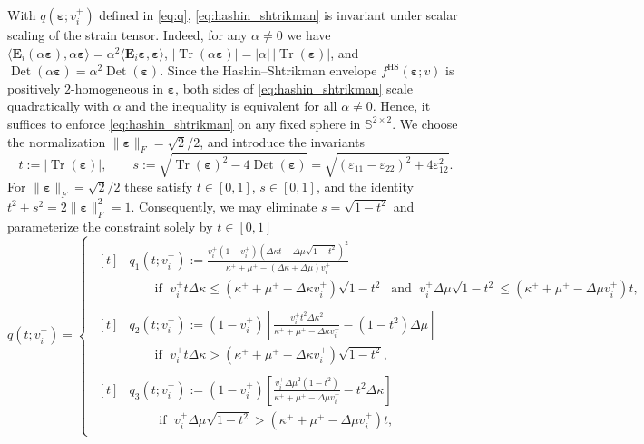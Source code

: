 \documentclass[preprint,3p]{elsarticle}
\newcommand{\tenss}[1]{\bm{\mathbf{#1}}}            %
\newcommand{\tensf}[1]{\bm{\mathbf{#1}}}            %
\newcommand{\strain}{\tenss{\varepsilon}}           %
\newcommand{\Ei}{\tensf{E}_i}                       %
\newcommand{\Tr}{\operatorname{Tr}}
\newcommand{\Det}{\operatorname{Det}}
\begin{document}
With $q(\strain;v_i^+)$ defined in \eqref{eq:q}, \eqref{eq:hashin_shtrikman} is invariant under scalar scaling of the strain tensor. Indeed, for any $\alpha\neq 0$ we have $\langle \Ei(\alpha\strain),\alpha\strain\rangle=\alpha^2\langle \Ei\strain,\strain\rangle$, $\lvert\Tr(\alpha\strain)\rvert=\lvert\alpha\rvert\,\lvert\Tr(\strain)\rvert$, and $\Det(\alpha\strain)=\alpha^2\Det(\strain)$. Since the Hashin--Shtrikman envelope $f^{\mathrm{HS}}(\strain;v)$ is positively $2$-homogeneous in $\strain$, both sides of \eqref{eq:hashin_shtrikman} scale quadratically with $\alpha$ and the inequality is equivalent for all $\alpha\neq 0$. Hence, it suffices to enforce \eqref{eq:hashin_shtrikman} on any fixed sphere in $\mathbb{S}^{2\times2}$. We choose the normalization $\lVert \strain \rVert_F=\sqrt{2}/2$, and introduce the invariants 
%
\begin{equation}\label{eq:ts_invariants}
t:=\lvert\Tr(\strain)\rvert,\qquad
s:=\sqrt{\Tr(\strain)^2-4\Det(\strain)}
     =\sqrt{(\varepsilon_{11}-\varepsilon_{22})^2+4\varepsilon_{12}^2}.
\end{equation}
%
For $\lVert \strain \rVert_F=\sqrt{2}/2$ these satisfy $t\in[0,1]$, $s\in[0,1]$, and the identity $t^2+s^2= 2\lVert\strain \rVert_F^2 = 1$. Consequently, we may eliminate $s=\sqrt{1-t^2}$ and parameterize the constraint solely by $t\in[0,1]$
%
\begin{equation}\label{eq:qt}
q(t;v_i^+) =
\begin{cases}
    \begin{aligned}[t]
        &q_1(t;v_i^+) := 
        \frac{v_i^{+}(1-v_i^{+}) \left(\Delta\kappa t - \Delta\mu \sqrt{1-t^2} \right)^{2}}{\kappa^+ + \mu^+ -(\Delta \kappa + \Delta \mu)v_i^+}\\
        &\qquad\text{if }\; v_i^{+}t \Delta \kappa \le (\kappa^+ + \mu^+ - \Delta \kappa v_i^+) \sqrt{1-t^2}
        \;\text{ and }\; v_i^{+} \Delta \mu \sqrt{1-t^2} \le (\kappa^+ + \mu^+ - \Delta \mu v_i^+) t,
    \end{aligned}\\
    \begin{aligned}[t]
        &q_2(t;v_i^+) :=  \left(1-{v_i^+}\right)\left[\frac{v_i^+ {t}^2 \Delta\kappa^2}{\kappa^+  + \mu^+ - \Delta \kappa v_i^+}-(1-t^2) \Delta \mu \right]\\
        &\qquad\text{if }\; v_i^{+}t \Delta \kappa > (\kappa^+ + \mu^+ - \Delta \kappa v_i^+) \sqrt{1-t^2},
    \end{aligned}\\
    \begin{aligned}[t]
        &q_3(t;v_i^+) :=
        \left(1-{v_i^+}\right)\left[\frac{{v_i^+} {\Delta \mu}^2 (1-t^2)}{\kappa^+ + \mu^+ - \Delta \mu v_i^+}-t^2 \Delta\kappa\right]\\
        &\qquad\text{ if }\; v_i^{+} \Delta \mu \sqrt{1-t^2} > (\kappa^{+} + \mu^{+} - \Delta \mu v_i^+) t,
    \end{aligned}
\end{cases}
\end{equation}
\end{document}
